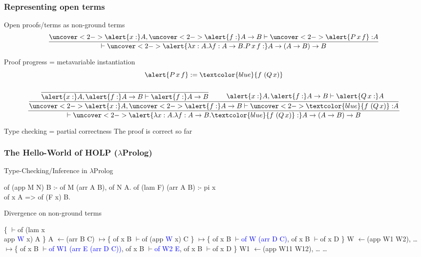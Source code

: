 \documentclass{beamer}
\newcommand{\vvdash}{$\vdash$}
\newcommand{\mmapsto}{$\mapsto$}
\newcommand{\lleftarrow}{$\leftarrow$}
\newcommand{\cblue}[1]{\textcolor{blue}{#1}}
\begin{document}
\begin{frame}[fragile]
\frametitle{Representing open terms}
 \begin{block}{Open proofs/terms as non-ground terms}
  $$\frac{\uncover<2->{\alert{x:}}A, \uncover<2->{\alert{f:}}A \to B \vdash \uncover<2->{\alert{P\, x\, f} :} A}{\vdash \uncover<2->{\alert{\lambda x:A. \lambda f:A \to B. P\, x\, f :}} A \to (A \to B) \to B}$$
  \pause
 \end{block}

 \pause

 \begin{block}{Proof progress = metavariable instantiation}
  $$\alert{P\, x\, f} := \cblue{f~(Q\,x)}$$
  $$\frac{\dfrac{
     \dfrac{}{\alert{x:}A, \alert{f:}A \to B \vdash \alert{f :} A \to B} \quad \quad \begin{array}{c}~\\\alert{x:}A, \alert{f:}A \to B \vdash \alert{Q\,x:}A\end{array}
    }
    {\uncover<2->{\alert{x:}}A, \uncover<2->{\alert{f:}}A \to B \vdash \uncover<2->{\cblue{f~(Q\,x)} :} A}}
    {\vdash \uncover<2->{\alert{\lambda x:A. \lambda f:A \to B. \cblue{f~(Q\,x)} :}} A \to (A \to B) \to B}$$
 \end{block}

 \begin{block}{Type checking = partial correctness}
  The proof is correct \alert{so far}
 \end{block}
\end{frame}

\begin{frame}[fragile]
 \frametitle{The Hello-World of HOLP ($\lambda$Prolog)}
 \begin{block}{Type-Checking/Inference in $\lambda$Prolog}
  {\small
  \begin{semiverbatim}
of (app M N) B :- of M (arr A B), of N A.
of (lam F) (arr A B) :-
  pi x\\ of x A => of (F x) B.
  \end{semiverbatim}}
 \end{block}

 \begin{block}{Divergence on non-ground terms}
{\small
 \begin{semiverbatim}
   \{ \vvdash of (lam x \\ app \cblue{W} x) A \}
\alert{A \lleftarrow (arr B C)}
\mmapsto \{ of x B \vvdash of (app \cblue{W} x) C \}
\mmapsto \{ of x B \vvdash \cblue{of W (arr D C)}, of x B \vvdash of x D \}
\alert{W \lleftarrow (app W1 W2), \ldots}
\mmapsto \{ of x B \vvdash \cblue{of W1 (arr E (arr D C))},
  of x B \vvdash \cblue{of W2 E}, of x B \vvdash of x D \}
\alert{W1 \lleftarrow (app W11 W12), \ldots}
\ldots
 \end{semiverbatim}}
 \end{block}
\end{frame}
\end{document}
